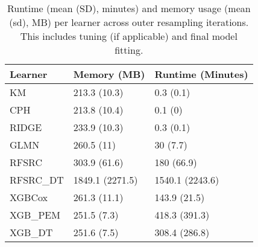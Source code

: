 \begin{table}
\centering
\caption{Runtime (mean (SD), minutes) and memory usage (mean (sd), MB) per learner across outer resampling iterations. This includes tuning (if applicable) and final model fitting.\label{tab:bm-runtime}}
\centering
\begin{tabular}[t]{lll}
\toprule
Learner & Memory (MB) & Runtime (Minutes)\\
\midrule
KM & 213.3 (10.3) & 0.3 (0.1)\\
CPH & 213.8 (10.4) & 0.1 (0)\\
RIDGE & 233.9 (10.3) & 0.3 (0.1)\\
GLMN & 260.5 (11) & 30 (7.7)\\
RFSRC & 303.9 (61.6) & 180 (66.9)\\
RFSRC\_DT & 1849.1 (2271.5) & 1540.1 (2243.6)\\
XGBCox & 261.3 (11.1) & 143.9 (21.5)\\
XGB\_PEM & 251.5 (7.3) & 418.3 (391.3)\\
XGB\_DT & 251.6 (7.5) & 308.4 (286.8)\\
\bottomrule
\end{tabular}
\end{table}
